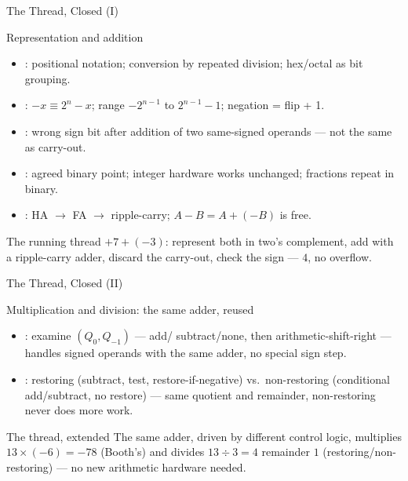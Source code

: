 \documentclass[aspectratio=169]{beamer}
\begin{document}
\begin{frame}{The Thread, Closed (I)}
  \begin{block}{Representation and addition}
    \small
    \begin{itemize}
      \item {}: positional notation; conversion by repeated
        division; hex/octal as bit grouping.
      \item {}: $-x \equiv 2^n - x$; range
        $-2^{n-1}$ to $2^{n-1}-1$; negation = flip + 1.
      \item {}: wrong sign bit after addition of two same-signed
        operands --- not the same as carry-out.
      \item {}: agreed binary point; integer hardware works
        unchanged; fractions repeat in binary.
      \item {}: HA $\to$ FA $\to$ ripple-carry; $A-B = A + (-B)$ is
        free.
    \end{itemize}
  \end{block}
  \begin{exampleblock}{The running thread}
    $+7 + (-3)$: represent both in two's complement, add with a ripple-carry
    adder, discard the carry-out, check the sign --- $4$, no overflow.
  \end{exampleblock}
\end{frame}

\begin{frame}{The Thread, Closed (II)}
  \begin{block}{Multiplication and division: the same adder, reused}
    \begin{itemize}
      \item {}: examine $(Q_0,Q_{-1})$ --- add/
        subtract/none, then arithmetic-shift-right --- handles signed
        operands with the same adder, no special sign step.
      \item {}: restoring (subtract, test, restore-if-negative)
        vs.\ non-restoring (conditional add/subtract, no restore) --- same
        quotient and remainder, non-restoring never does more work.
    \end{itemize}
  \end{block}
  \begin{exampleblock}{The thread, extended}
    The same adder, driven by different control logic, multiplies
    $13\times(-6)=-78$ (Booth's) and divides $13\div3 = 4$ remainder $1$
    (restoring/non-restoring) --- no new arithmetic hardware needed.
  \end{exampleblock}
\end{frame}
\end{document}
